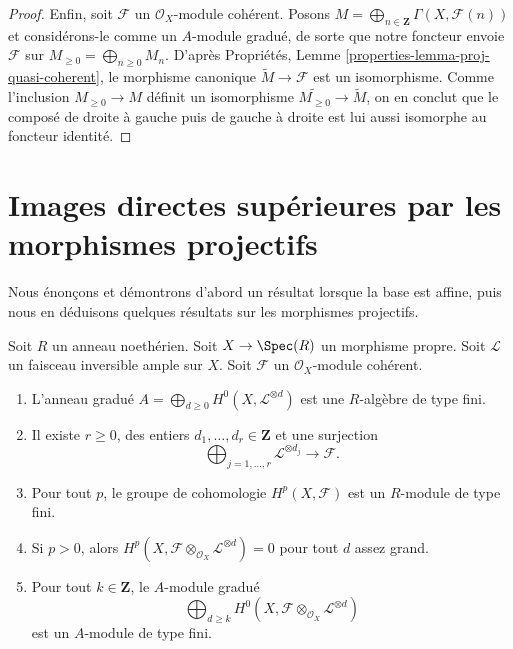 \begin{proof}
\medskip\noindent
Enfin, soit $\mathcal{F}$ un $\mathcal{O}_X$-module cohérent.
Posons $M = \bigoplus_{n \in \mathbf{Z}} \Gamma(X, \mathcal{F}(n))$ et
considérons-le comme un $A$-module gradué, de sorte que notre foncteur envoie
$\mathcal{F}$ sur $M_{\geq 0} = \bigoplus_{n \geq 0} M_n$.
D'après Propriétés, Lemme \ref{properties-lemma-proj-quasi-coherent}, le
morphisme canonique $\widetilde M \to \mathcal{F}$ est un isomorphisme.
Comme l'inclusion $M_{\geq 0} \to M$ définit un isomorphisme
$\widetilde{M_{\geq 0}} \to \widetilde M$, on en conclut que le composé de
droite à gauche puis de gauche à droite est lui aussi isomorphe au foncteur
identité.
\end{proof}










\section{Images directes supérieures par les morphismes projectifs}
\label{section-projective-pushforward}

\noindent
Nous énonçons et démontrons d'abord un résultat lorsque la base est affine,
puis nous en déduisons quelques résultats sur les morphismes projectifs.

\begin{lemma}
\label{lemma-coherent-proper-ample}
Soit $R$ un anneau noethérien. Soit $X \to \Spec(R)$ un morphisme propre.
Soit $\mathcal{L}$ un faisceau inversible ample sur $X$. Soit $\mathcal{F}$
un $\mathcal{O}_X$-module cohérent.
\begin{enumerate}
\item L'anneau gradué
$A = \bigoplus_{d \geq 0} H^0(X, \mathcal{L}^{\otimes d})$
est une $R$-algèbre de type fini.
\item Il existe $r \geq 0$, des entiers
$d_1, \ldots, d_r \in \mathbf{Z}$ et une surjection
$$
\bigoplus\nolimits_{j = 1, \ldots, r} \mathcal{L}^{\otimes d_j}
\longrightarrow \mathcal{F}.
$$
\item Pour tout $p$, le groupe de cohomologie $H^p(X, \mathcal{F})$ est un
$R$-module de type fini.
\item Si $p > 0$, alors
$H^p(X, \mathcal{F} \otimes_{\mathcal{O}_X} \mathcal{L}^{\otimes d}) = 0$
pour tout $d$ assez grand.
\item Pour tout $k \in \mathbf{Z}$, le $A$-module gradué
$$
\bigoplus\nolimits_{d \geq k}
H^0(X, \mathcal{F} \otimes_{\mathcal{O}_X} \mathcal{L}^{\otimes d})
$$
est un $A$-module de type fini.
\end{enumerate}
\end{lemma}

